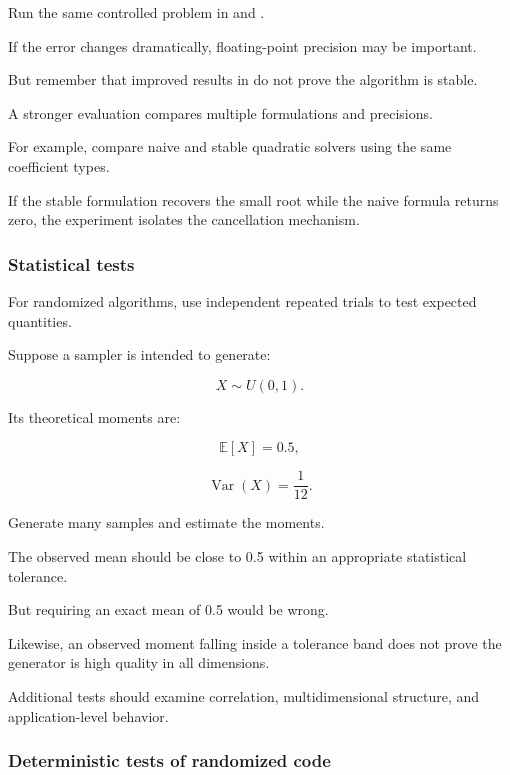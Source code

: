 \hypertarget{02-foundations-ii-ch031-cross-precision-tests}{}

Run the same controlled problem in  and .

If the error changes dramatically, floating-point precision may be important.

But remember that improved results in  do not prove the algorithm is stable.

A stronger evaluation compares multiple formulations and precisions.

For example, compare naive and stable quadratic solvers using the same coefficient types.

If the stable formulation recovers the small root while the naive formula returns zero, the experiment isolates the cancellation mechanism.

\subsubsection{Statistical tests}\label{02-foundations-ii-ch031-statistical-tests}

\hypertarget{02-foundations-ii-ch031-statistical-tests}{}

For randomized algorithms, use independent repeated trials to test expected quantities.

Suppose a sampler is intended to generate:

\[ X\sim U(0,1). \]

Its theoretical moments are:

\[ \mathbb E[X]=0.5, \]

\[ \operatorname{Var}(X)=\frac1{12}. \]

Generate many samples and estimate the moments.

The observed mean should be close to 0.5 within an appropriate statistical tolerance.

But requiring an exact mean of 0.5 would be wrong.

Likewise, an observed moment falling inside a tolerance band does not prove the generator is high quality in all dimensions.

Additional tests should examine correlation, multidimensional structure, and application-level behavior.

\subsubsection{Deterministic tests of randomized code}\label{02-foundations-ii-ch031-deterministic-tests-of-randomized-code}

